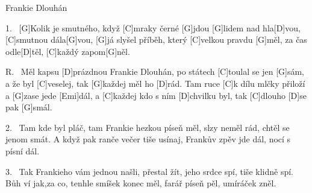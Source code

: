 \begin{song}{Frankie Dlouhán}{}

\begin{xverse}{1.~}
[G]Kolik je smutného, když [C]mraky černé [G]jdou
[G]lidem nad hla[D]vou, [C]smutnou dála[G]vou,
[G]já slyšel příběh, který [C]velkou pravdu [G]měl,
za čas odle[D]těl, [C]každý zapom[G]něl.
\end{xverse}

\begin{xverse}{R.~}
Měl kapsu [D]prázdnou Frankie Dlouhán,
po státech [C]toulal se jen [G]sám,
a že byl [C]veselej, tak [G]každej měl ho [D]rád.
Tam ruce [C]k dílu mlčky přiloží a [G]zase jede [Emi]dál,
a [C]každej kdo s ním [D]chvilku byl,
tak [C]dlouho [D]se pak [G]smál.
\end{xverse}

\begin{xverse}{2.~}
Tam kde byl pláč, tam Frankie hezkou píseň měl,
slzy neměl rád, chtěl se jenom smát.
A když pak ranče večer tiše usínaj,
Frankův zpěv jde dál, nocí s písní dál.
\end{xverse}

\begin{xverse}{3.~}
Tak Frankieho vám jednou našli, přestal žít,
jeho srdce spí, tiše klidně spí.
Bůh ví jak,za co, tenhle smíšek konec měl,
farář píseň pěl, umíráček zněl.
\end{xverse}

\end{song}

%
%
%
%
%
%
%
%
%

